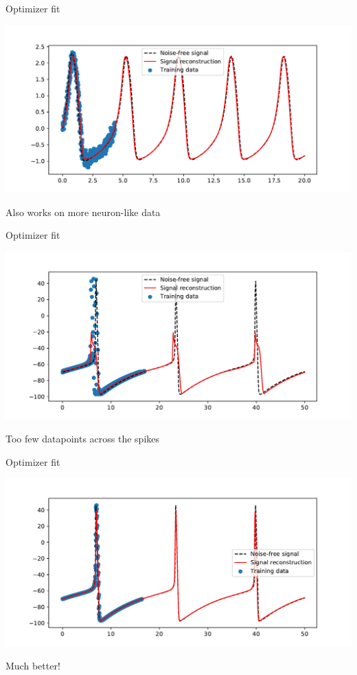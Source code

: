 \documentclass[presentation]{beamer}
\begin{document}
\begin{frame}[label={sec:org829da8f}]{Optimizer fit}
   \begin{center}
\includegraphics[width=.9\linewidth]{./HRFit.pdf}
\end{center}
Also works on more neuron-like data
\end{frame}

\begin{frame}[label={sec:org4abbdd6}]{Optimizer fit}
   \begin{center}
\includegraphics[width=.9\linewidth]{./HHFit.pdf}
\end{center}
Too few datapoints across the spikes
\end{frame}

\begin{frame}[label={sec:org1195fcc}]{Optimizer fit}
  \begin{center}
\includegraphics[width=.9\linewidth]{./HHFit2.pdf}
\end{center}
Much better!
\end{frame}
\end{document}

